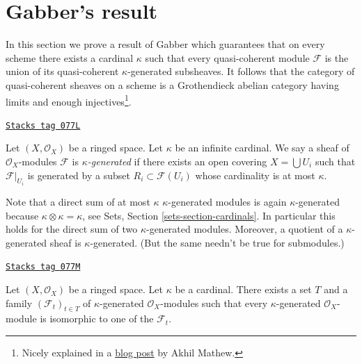 \section{Gabber's result}
\label{properties-section-gabber}
In this section we prove a result of Gabber which guarantees that on every
scheme there exists a cardinal $\kappa$ such that every quasi-coherent
module $\mathcal{F}$ is the union of its quasi-coherent
$\kappa$-generated subsheaves. It follows that the category of quasi-coherent
sheaves on a scheme is a Grothendieck abelian category having
limits and enough injectives\footnote{Nicely explained in a
\href{https://amathew.wordpress.com/2011/07/30/quasi-coherent-sheaves-presentable-categories-and-a-result-of-gabber/}{blog post}
by Akhil Mathew.}.

\begin{definition}
\label{properties-definition-kappa-generated}
\href{https://stacks.math.columbia.edu/tag/077L}{\texttt{Stacks tag 077L}}

Let $(X, \mathcal{O}_X)$ be a ringed space. Let $\kappa$ be an infinite
cardinal. We say a sheaf of $\mathcal{O}_X$-modules $\mathcal{F}$ is
{\it $\kappa$-generated} if there exists an open covering
$X = \bigcup U_i$ such that $\mathcal{F}|_{U_i}$ is generated by
a subset $R_i \subset \mathcal{F}(U_i)$ whose cardinality is
at most $\kappa$.
\end{definition}

Note that a direct sum of at most $\kappa$ $\kappa$-generated modules is
again $\kappa$-generated because $\kappa \otimes \kappa = \kappa$, see
Sets, Section \ref{sets-section-cardinals}.
In particular this holds for the direct sum of two $\kappa$-generated modules.
Moreover, a quotient of a $\kappa$-generated sheaf is $\kappa$-generated.
(But the same needn't be true for submodules.)

\begin{lemma}
\label{properties-lemma-set-of-iso-classes}
\href{https://stacks.math.columbia.edu/tag/077M}{\texttt{Stacks tag 077M}}

Let $(X, \mathcal{O}_X)$ be a ringed space. Let $\kappa$ be a cardinal.
There exists a set $T$ and a family $(\mathcal{F}_t)_{t \in T}$ of
$\kappa$-generated $\mathcal{O}_X$-modules such that every $\kappa$-generated
$\mathcal{O}_X$-module is isomorphic to one of the $\mathcal{F}_t$.
\end{lemma}

